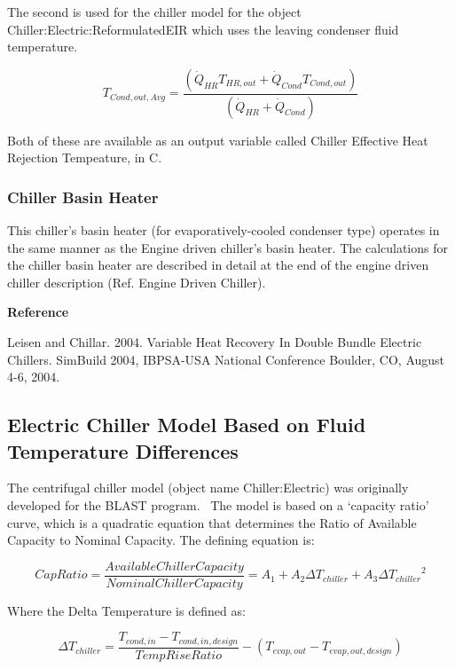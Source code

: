 The second is used for the chiller model for the object Chiller:Electric:ReformulatedEIR which uses the leaving condenser fluid temperature.

\begin{equation}
{T_{Cond,out,Avg}} = \frac{{\left( {{{\dot Q}_{HR}}{T_{HR,out}} + {{\dot Q}_{Cond}}{T_{Cond,out}}} \right)}}{{\left( {{{\dot Q}_{HR}} + {{\dot Q}_{Cond}}} \right)}}
\end{equation}

Both of these are available as an output variable called Chiller Effective Heat Rejection Tempeature, in C.

\subsubsection{Chiller Basin Heater}\label{chiller-basin-heater-2}

This chiller's basin heater (for evaporatively-cooled condenser type) operates in the same manner as the Engine driven chiller's basin heater. The calculations for the chiller basin heater are described in detail at the end of the engine driven chiller description (Ref. Engine Driven Chiller).

\textbf{Reference}

Leisen and Chillar. 2004. Variable Heat Recovery In Double Bundle Electric Chillers. SimBuild 2004, IBPSA-USA National Conference Boulder, CO, August 4-6, 2004.

\subsection{Electric Chiller Model Based on Fluid Temperature Differences}\label{electric-chiller-model-based-on-fluid-temperature-differences}

The centrifugal chiller model (object name Chiller:Electric) was originally developed for the BLAST program.~ The model is based on a `capacity ratio' curve, which is a quadratic equation that determines the Ratio of Available Capacity to Nominal Capacity. The defining equation is:

\begin{equation}
CapRatio = \frac{{Available Chiller Capacity}}{{Nominal Chiller Capacity}} = {A_1} + {A_2}\Delta {T_{chiller}} + {A_3}\Delta {T_{chiller}}^2
\end{equation}

Where the Delta Temperature is defined as:

\begin{equation}
\Delta {T_{chiller}} = \frac{{{T_{cond, in}} - {T_{cond,in,design}}}}{{TempRiseRatio}} - \left( {{T_{evap,out}} - {T_{evap,out,design}}} \right)
\end{equation}

